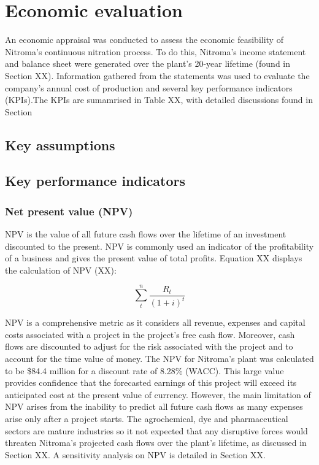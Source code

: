 \section{Economic evaluation}
An economic appraisal was conducted to assess the economic feasibility of Nitroma’s continuous nitration process. To do this, Nitroma’s income statement and balance sheet were generated over the plant’s 20-year lifetime (found in Section XX). Information gathered from the statements was used to evaluate the company’s annual cost of production and several key performance indicators (KPIs).The KPIs are sumamrised in Table XX, with detailed discussions found in Section

\subsection{Key assumptions}

\subsection{Key performance indicators}

\subsubsection{Net present value (NPV)}
NPV is the value of all future cash flows over the lifetime of an investment discounted to the present. NPV is commonly used an indicator of the profitability of a business and gives the present value of total profits. Equation XX displays the calculation of NPV (XX):

\begin{equation}
\label{eqn:npv}
    \sum_t^n\frac{R_{t}}{(1+i)^{t}}
\end{equation}

NPV is a comprehensive metric as it considers all revenue, expenses and capital costs associated with a project in the project’s free cash flow. Moreover, cash flows are discounted to adjust for the risk associated with the project and to account for the time value of money. The NPV for Nitroma’s plant was calculated to be \$84.4 million for a discount rate of 8.28\% (WACC). This large value provides confidence that the forecasted earnings of this project will exceed its anticipated cost at the present value of currency. However, the main limitation of NPV arises from the inability to predict all future cash flows as many expenses arise only after a project starts. The agrochemical, dye and pharmaceutical sectors are mature industries so it not expected that any disruptive forces would threaten Nitroma’s projected cash flows over the plant’s lifetime, as discussed in Section XX. A sensitivity analysis on NPV is detailed in Section XX. 

